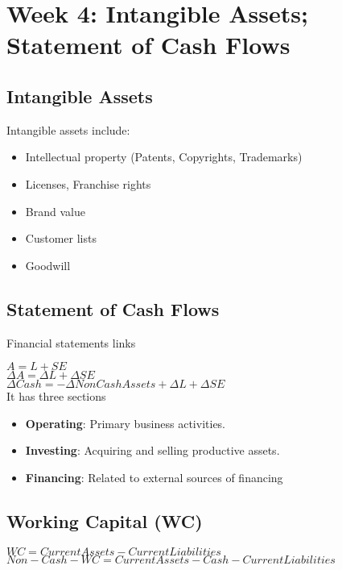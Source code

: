 \section*{Week 4: Intangible Assets; Statement of Cash Flows}

\subsection*{Intangible Assets}


Intangible assets include:
\begin{itemize}
	\item Intellectual property (Patents, Copyrights, Trademarks)
	\item Licenses, Franchise rights
	\item Brand value
	\item Customer lists
	\item Goodwill
\end{itemize}


\subsection*{Statement of Cash Flows}

Financial statements links

$A = L  + SE$ \\
$\Delta A = \Delta L + \Delta SE $ \\
$\Delta Cash = - \Delta NonCashAssets + \Delta L + \Delta SE $ \\

It has three sections

\begin{itemize}
	\item \textbf{Operating}: Primary business activities.
	\item \textbf{Investing}: Acquiring and selling productive assets.
	\item \textbf{Financing}: Related to external sources of financing
\end{itemize}


\subsection*{Working Capital (WC)}


$WC = CurrentAssets - CurrentLiabilities$ \\
$Non-Cash-WC = CurrentAssets - Cash - CurrentLiabilities $ \\

